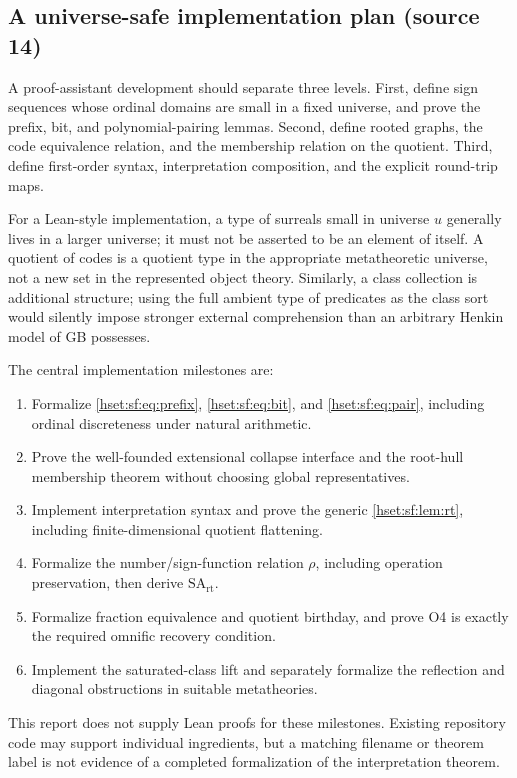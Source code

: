\documentclass[11pt,letterpaper]{article}
\theoremstyle{definition}
\theoremstyle{remark}
\newcommand{\SArt}{\mathrm{SA}_{\mathrm{rt}}}
\begin{document}
\subsection{A universe-safe implementation plan (source 14)}

A proof-assistant development should separate three levels. First, define sign
sequences whose ordinal domains are small in a fixed universe, and prove the prefix,
bit, and polynomial-pairing lemmas. Second, define rooted graphs, the code
equivalence relation, and the membership relation on the quotient. Third, define
first-order syntax, interpretation composition, and the explicit round-trip maps.

For a Lean-style implementation, a type of surreals small in universe $u$ generally
lives in a larger universe; it must not be asserted to be an element of itself. A
quotient of codes is a quotient type in the appropriate metatheoretic universe, not
a new set in the represented object theory. Similarly, a class collection is
additional structure; using the full ambient type of predicates as the class sort
would silently impose stronger external comprehension than an arbitrary Henkin model
of GB possesses.

The central implementation milestones are:
\begin{enumerate}[label=\textbf{F\arabic*.}]
\item Formalize \eqref{hset:sf:eq:prefix}, \eqref{hset:sf:eq:bit}, and
\eqref{hset:sf:eq:pair}, including ordinal discreteness under natural arithmetic.
\item Prove the well-founded extensional collapse interface and the root-hull
membership theorem without choosing global representatives.
\item Implement interpretation syntax and prove the generic \cref{hset:sf:lem:rt},
including finite-dimensional quotient flattening.
\item Formalize the number/sign-function relation $\rho$, including operation
preservation, then derive $\SArt$.
\item Formalize fraction equivalence and quotient birthday, and prove O4 is exactly
the required omnific recovery condition.
\item Implement the saturated-class lift and separately formalize the reflection and
diagonal obstructions in suitable metatheories.
\end{enumerate}
This report does not supply Lean proofs for these milestones. Existing repository
code may support individual ingredients, but a matching filename or theorem label is
not evidence of a completed formalization of the interpretation theorem.
\end{document}
